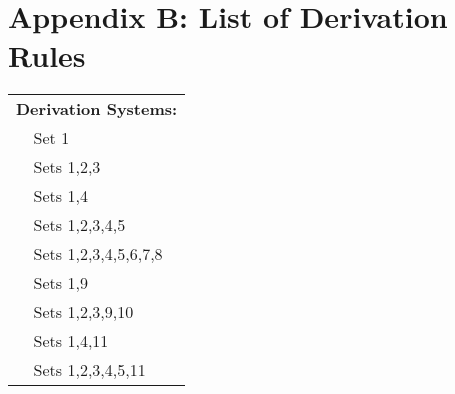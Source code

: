 
\chapter*{Appendix B: List of Derivation Rules}
\fancyhead[LE,RO]{\textsf{\thepage}}
\setcounter{section}{0}

\begin{tabular}{ l l }
\multicolumn{2}{l}{\textbf{Derivation Systems:}}\\
\GSD{}& Set 1\\
\GSDP{}& Sets 1,2,3\\
\GQD{}& Sets 1,4\\
\GQDP{}& Sets 1,2,3,4,5\\
\GQDPP{}& Sets 1,2,3,4,5,6,7,8\\
\SF{}& Sets 1,9\\
\SFP{}& Sets 1,2,3,9,10\\
\GQDI{}& Sets 1,4,11\\
\GQDIP{}& Sets 1,2,3,4,5,11\\
\end{tabular}

